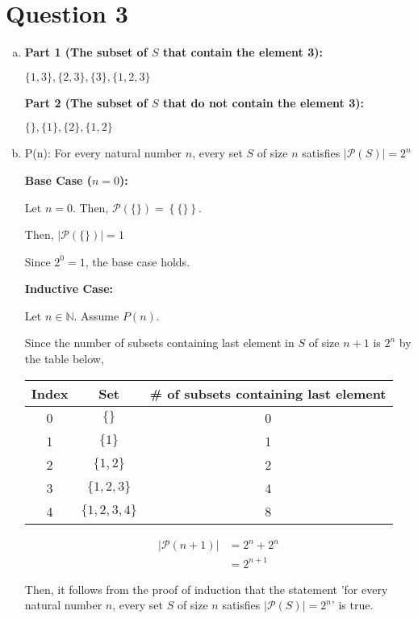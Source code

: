 \documentclass[12pt]{article}
\begin{document}
\section*{Question 3}
\begin{enumerate}[a.]
    \item

    \textbf{Part 1 (The subset of $S$ that contain the element 3):}

    $\{1,3\}, \{2,3\}, \{3\}, \{1,2,3\}$

    \bigskip

    \textbf{Part 2 (The subset of $S$ that do not contain the element 3):}

    $\{\},\{1\},\{2\},\{1,2\}$

    \item

    P(n): For every natural number $n$, every set $S$ of size $n$ satisfies
    $\vert \mathcal{P}(S) \vert = 2^n$

    \textbf{Base Case ($n = 0$):}

    \bigskip

    Let $n = 0$. Then, $\mathcal{P}(\{\}) = \left\{\{\}\right\}$.

    \bigskip

    Then, $\vert \mathcal{P}(\{\}) \vert = 1$

    \bigskip

    Since $2^0 = 1$, the base case holds.

    \bigskip

    \textbf{Inductive Case:}

    Let $n \in \mathbb{N}$. Assume $P(n)$.

    \bigskip

    Since the number of subsets containing last element in $S$ of size $n+1$ is
    $2^{n}$ by the table below,

    \begin{tabular}{c | c | c}
        Index & Set & \# of subsets containing last element\\
        \hline
        0 & $\{\}$ & 0\\
        \hline
        1 & $\{1\}$ & 1\\
        \hline
        2 & $\{1,2\}$ & 2\\
        \hline
        3 & $\{1,2,3\}$ & 4\\
        \hline
        4 & $\{1,2,3,4\}$ & 8
    \end{tabular}

    \bigskip

    \setcounter{equation}{0}
    \begin{align}
        \vert \mathcal{P}(n+1) \vert &= 2^n + 2^n\\
        &= 2^{n+1}
    \end{align}

    \bigskip

    Then, it follows from the proof of induction that the statement 'for every natural
    number $n$, every set $S$ of size $n$ satisfies $\vert \mathcal{P}(S) \vert = 2^n$'
    is true.

\end{enumerate}
\end{document}
